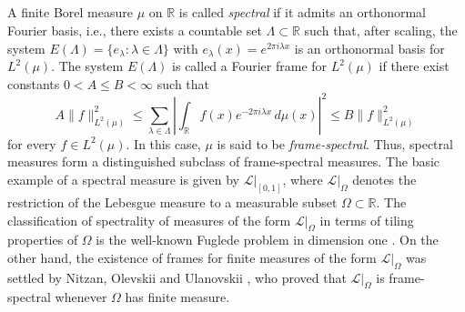 \documentclass[reqno,a4paper,12pt]{amsart}
\def\R{{\mathbb R}}
\begin{document}
\subsection{}
A finite Borel measure $\mu$ on $\R$ is called \emph{spectral} if it admits an orthonormal Fourier basis, i.e., there exists a countable set $\Lambda \subset \R$ such that, after scaling, the system $E(\Lambda) = \{ e_\lambda : \lambda \in \Lambda \}$ with $e_\lambda(x)=e^{2\pi i \lambda x}$ is an orthonormal basis for $L^2(\mu)$. The system $E(\Lambda)$ is called a Fourier frame for
$L^2(\mu)$ if there exist constants $0<A\leq B<\infty$ such that
$$
    A\|f\|_{L^2(\mu)}^2
    \leq
    \sum_{\lambda\in\Lambda}
    \left|
        \int_\R f(x)e^{-2\pi i\lambda x}\,d\mu(x)
    \right|^2
    \leq
    B\|f\|_{L^2(\mu)}^2
$$
for every $f\in L^2(\mu)$. In this case, $\mu$ is said to be \emph{frame-spectral}.
Thus, spectral measures form a distinguished subclass of frame-spectral measures.
The basic example of a spectral measure is given by $\mathcal{L}|_{[0,1]}$, where $\mathcal{L}|_\Omega$ denotes the restriction of the Lebesgue measure to a measurable subset $\Omega \subset \R$.
The classification of spectrality of measures of the form $\mathcal{L}|_{\Omega}$ in terms of tiling properties of $\Omega$ is the well-known Fuglede problem in dimension one \cite{fuglede1974commuting}. On the other hand, the existence of frames for finite measures of the form $\mathcal{L}|_{\Omega}$ was settled by Nitzan, Olevskii and Ulanovskii \cite{nitzan2016exponential}, who proved that $\mathcal{L}|_{\Omega}$ is frame-spectral whenever $\Omega$ has finite measure.
\end{document}
